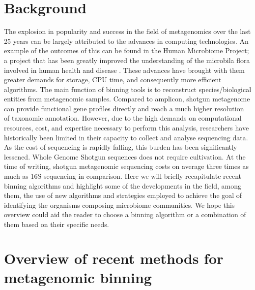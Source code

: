 \documentclass{article}
\begin{document}
\section{Background}
The explosion in popularity and success in the field of metagenomics over the last 25 years can be largely attributed to the advances in computing technologies.
An example of the outcomes of this can be found in the Human Microbiome Project; a project that has been greatly improved the understanding of the microbila flora involved in human health and disease \cite{turnbaugh2007human}.
These advances have brought with them greater demands for storage, CPU time, and consequently more efficient algorithms.
The main function of binning tools is to reconstruct species/biological entities from metagenomic samples.  
Compared to amplicon, shotgun metagenome can provide functional gene profiles directly and reach a much higher resolution of taxonomic annotation.
However, due to the high demands on computational resources, cost, and expertise necessary to perform this analysis, researchers have historically been limited in their capacity to collect and analyse sequencing data.
As the cost of sequencing is rapidly falling, this burden has been significantly lessened.
Whole Genome Shotgun sequences does not require cultivation.
At the time of writing, shotgun metagenomic sequencing costs on average three times as much as 16S sequencing in comparison.
Here we will briefly recapitulate recent binning algorithms and highlight some of the developments in the field, among them, the use of new algorithms and strategies employed to achieve the goal of identifying the organisms composing microbiome communities.
We hope this overview could aid the reader to choose a binning algorithm or a combination of them based on their specific needs.

\section{Overview of recent methods for metagenomic binning}
\end{document}
